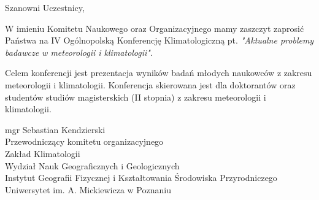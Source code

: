 \Large
\raggedright Szanowni Uczestnicy,

W imieniu Komitetu Naukowego oraz Organizacyjnego mamy zaszczyt zaprosić Państwa na IV
Ogólnopolską  Konferencję  Klimatologiczną pt. \emph{ "Aktualne    problemy    badawcze w meteorologii i klimatologii"}.

Celem  konferencji  jest  prezentacja  wyników  badań  młodych  naukowców  z  zakresu meteorologii  i  klimatologii. Konferencja  skierowana jest  dla  doktorantów  oraz  studentów  studiów magisterskich (II stopnia) z zakresu meteorologii i klimatologii. 


\vspace{4.5cm}

\large
\begin{flushleft}
mgr Sebastian Kendzierski \\
Przewodniczący komitetu organizacyjnego \\ 
Zakład Klimatologii \\ 
Wydział Nauk Geograficznych i Geologicznych \\ 
Instytut Geografii Fizycznej i Kształtowania Środowiska Przyrodniczego \\ 
Uniwersytet im. A. Mickiewicza w Poznaniu
\end{flushleft}
